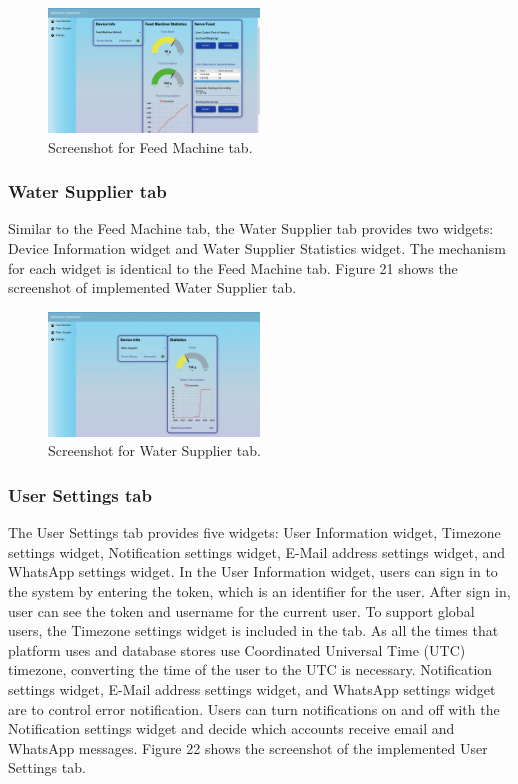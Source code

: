 \documentclass[conference]{IEEEtran}
\begin{document}
\begin{figure}[htbp]
\centerline{\includegraphics[width=0.5\textwidth]{./images/feed_machine_ui.png}}
\caption{Screenshot for Feed Machine tab.}
\label{fig}
\end{figure}

\subsubsection{Water Supplier tab}
Similar to the Feed Machine tab, the Water Supplier tab provides two widgets: Device Information widget and Water Supplier Statistics widget. The mechanism for each widget is identical to the Feed Machine tab. Figure 21 shows the screenshot of implemented Water Supplier tab.

\begin{figure}[htbp]
\centerline{\includegraphics[width=0.5\textwidth]{./images/water_supplier_ui.png}}
\caption{Screenshot for Water Supplier tab.}
\label{fig}
\end{figure}

\subsubsection{User Settings tab}
The User Settings tab provides five widgets: User Information widget, Timezone settings widget, Notification settings widget, E-Mail address settings widget, and WhatsApp settings widget. 
In the User Information widget, users can sign in to the system by entering the token, which is an identifier for the user. After sign in, user can see the token and username for the current user.
To support global users, the Timezone settings widget is included in the tab. As all the times that platform uses and database stores use Coordinated Universal Time (UTC) timezone, converting the time of the user to the UTC is necessary.
Notification settings widget, E-Mail address settings widget, and WhatsApp settings widget are to control error notification. Users can turn notifications on and off with the Notification settings widget and decide which accounts receive email and WhatsApp messages. Figure 22 shows the screenshot of the implemented User Settings tab.
\end{document}
